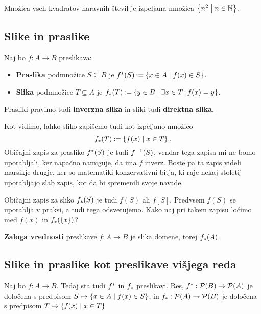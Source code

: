 \begin{primer}
  Množica vseh kvadratov naravnih števil je izpeljana množica $\left\{ n^2 \; \middle| \; n \in \mathbb{N} \right\}$.
\end{primer}


\subsection{Slike in praslike}

\begin{definicija}
  Naj bo $f : A \to B$ preslikava:
  \begin{itemize}
  \item \textbf{Praslika} podmnožice $S \subseteq B$ je $f^{*}(S) \mathbin{{:}{=}} \left\{ x \in A \; \middle| \; f(x) \in S \right\}$.
  \item \textbf{Slika} podmnožice $T \subseteq A$ je $f_{*}(T) \mathbin{{:}{=}} \left\{ y \in B \; \middle| \; \exists x \in T \,.\, f(x) = y \right\}$.
  \end{itemize}
\end{definicija}
%
Prasliki pravimo tudi \textbf{inverzna slika} in sliki tudi \textbf{direktna slika}.

Kot vidimo, lahko sliko zapišemo tudi kot izpeljano množico
%
\begin{equation*}
  f_{*}(T) \mathbin{{:}{=}} \left\{ f(x) \; \middle| \; x \in T \right\}.
\end{equation*}
%
Običajni zapis za prasliko $f^{*}(S)$ je tudi ${f}^{-1}(S)$, vendar tega zapisa mi ne bomo uporabljali, ker napačno namiguje, da ima $f$ inverz. Boste pa ta zapis videli marsikje drugje, ker so matematiki konzervativni bitja, ki raje nekaj stoletij uporabljajo slab zapis, kot da bi spremenili svoje navade.

Običajni zapis za sliko $f_{*}(S)$ je tudi $f(S)$ ali $f[S]$. Predvsem $f(S)$ se uporablja v praksi, a tudi tega odsvetujemo. Kako naj pri takem zapisu ločimo med $f(x)$ in $f_{*}(\left\{x\right\})$?

\begin{definicija}
  \textbf{Zaloga vrednosti} preslikave $f : A \to B$ je slika domene, torej $f_{*}(A)$.
\end{definicija}


\subsection{Slike in praslike kot preslikave višjega reda}

Naj bo $f : A \to B$. Tedaj sta tudi $f^{*}$ in $f_{*}$ preslikavi.
%
Res, $f^{*} : \mathcal{P}(B) \to \mathcal{P}(A)$ je določena s predpisom $S \mapsto \left\{ x \in A \; \middle| \; f(x) \in S \right\}$, in
$f_{*} : \mathcal{P}(A) \to \mathcal{P}(B)$ je določena s predpisom $T \mapsto \left\{ f(x) \; \middle| \; x \in T \right\}$

